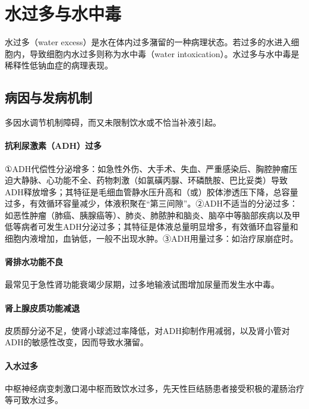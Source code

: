 \protect\hypertarget{text00191.html}{}{}

\section{水过多与水中毒}

水过多（water
excess）是水在体内过多潴留的一种病理状态。若过多的水进入细胞内，导致细胞内水过多则称为水中毒（water
intoxication）。水过多与水中毒是稀释性低钠血症的病理表现。

\subsection{病因与发病机制}

多因水调节机制障碍，而又未限制饮水或不恰当补液引起。

\paragraph{抗利尿激素（ADH）过多}

①ADH代偿性分泌增多：如急性外伤、大手术、失血、严重感染后、胸腔肿瘤压迫大静脉、心功能不全、药物刺激（如氯磺丙脲、环磷酰胺、巴比妥类）导致ADH释放增多；其特征是毛细血管静水压升高和（或）胶体渗透压下降，总容量过多，有效循环容量减少，体液积聚在“第三间隙”。②ADH不适当的分泌过多：如恶性肿瘤（肺癌、胰腺癌等）、肺炎、肺脓肿和脑炎、脑卒中等脑部疾病以及甲低等病者可发生ADH分泌过多；其特征是体液总量明显增多，有效循环血容量和细胞内液增加，血钠低，一般不出现水肿。③ADH用量过多：如治疗尿崩症时。

\paragraph{肾排水功能不良}

最常见于急性肾功能衰竭少尿期，过多地输液试图增加尿量而发生水中毒。

\paragraph{肾上腺皮质功能减退}

皮质醇分泌不足，使肾小球滤过率降低，对ADH抑制作用减弱，以及肾小管对ADH的敏感性改变，因而导致水潴留。

\paragraph{入水过多}

中枢神经病变刺激口渴中枢而致饮水过多，先天性巨结肠患者接受积极的灌肠治疗等可致水过多。

